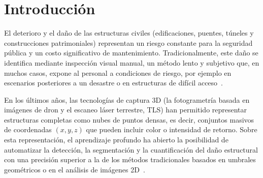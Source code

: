 \documentclass[5p]{elsarticle}
\begin{document}
\section{Introducción}

El deterioro y el daño de las estructuras civiles (edificaciones, puentes, túneles y construcciones patrimoniales) representan un riesgo constante para la seguridad pública y un costo significativo de mantenimiento. Tradicionalmente, este daño se identifica mediante inspección visual manual, un método lento y subjetivo que, en muchos casos, expone al personal a condiciones de riesgo, por ejemplo en escenarios posteriores a un desastre o en estructuras de difícil acceso~\cite{Hake2023}.

En los últimos años, las tecnologías de captura 3D (la fotogrametría basada en imágenes de dron y el escaneo láser terrestre, TLS) han permitido representar estructuras completas como nubes de puntos densas, es decir, conjuntos masivos de coordenadas $(x,y,z)$ que pueden incluir color o intensidad de retorno. Sobre esta representación, el aprendizaje profundo ha abierto la posibilidad de automatizar la detección, la segmentación y la cuantificación del daño estructural con una precisión superior a la de los métodos tradicionales basados en umbrales geométricos o en el análisis de imágenes 2D~\cite{Hake2023,Zahs2023}.
\end{document}
